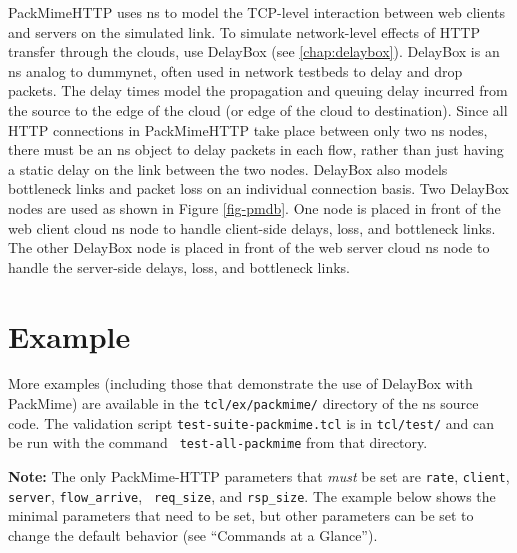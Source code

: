 PackMimeHTTP uses ns to model the TCP-level interaction between web
clients and servers on the simulated link. To simulate network-level
effects of HTTP transfer through the clouds, use DelayBox (see
\ref{chap:delaybox}). DelayBox is an ns analog to dummynet, often used
in network testbeds to delay and drop packets. The delay times model
the propagation and queuing delay incurred from the source to the edge
of the cloud (or edge of the cloud to destination). Since all HTTP
connections in PackMimeHTTP take place between only two ns nodes,
there must be an ns object to delay packets in each flow, rather
than just having a static delay on the link between the two
nodes. DelayBox also models bottleneck links and packet loss on an
individual connection basis. Two DelayBox nodes are used as shown in
Figure \ref{fig-pmdb}. One node is placed in front of the web client
cloud ns node to handle client-side delays, loss, and bottleneck
links. The other DelayBox node is placed in front of the web server
cloud ns node to handle the server-side delays, loss, and bottleneck
links.

\section{Example}
More examples (including those that demonstrate the use of DelayBox
with PackMime) are available in the {\tt tcl/ex/packmime/} directory of the
ns source code.  The validation script {\tt test-suite-packmime.tcl}
is in {\tt tcl/test/} and can be run with the command {\tt
test-all-packmime} from that directory.

\textbf{Note:}  The only PackMime-HTTP parameters that \emph{must} be set are
       {\tt rate}, {\tt client}, {\tt server}, {\tt flow\_arrive}, {\tt
       req\_size}, and {\tt rsp\_size}.  The example below shows the
       minimal parameters that need to be set, but other parameters
       can be set to change the default behavior (see ``Commands at a
       Glance'').  


